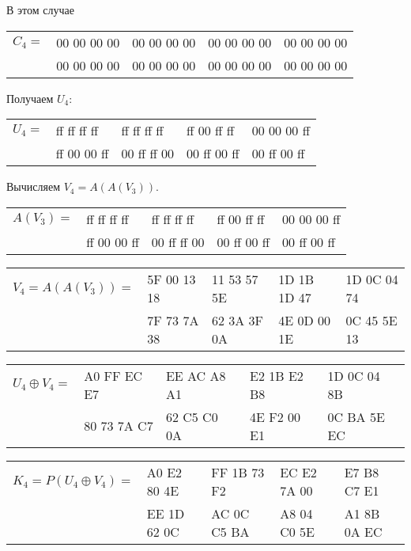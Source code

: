 \documentclass[10pt]{article}
\begin{document}
В этом случае

\begin{center}
  \begin{tabular}{lllll}
    $C_4 =$ & 00 00 00 00 & 00 00 00 00 & 00 00 00 00 & 00 00 00 00 \\
            & 00 00 00 00 & 00 00 00 00 & 00 00 00 00 & 00 00 00 00 \\
  \end{tabular}
\end{center}

Получаем $U_4$:

\begin{center}
  \begin{tabular}{lllll}
    $U_4 =$ & ff ff ff ff & ff ff ff ff & ff 00 ff ff & 00 00 00 ff \\
            & ff 00 00 ff & 00 ff ff 00 & 00 ff 00 ff & 00 ff 00 ff \\
  \end{tabular}
\end{center}

Вычисляем $V_4 = A(A(V_3))$.

\begin{center}
  \begin{tabular}{lllll}
    $A(V_3) =$ & ff ff ff ff & ff ff ff ff & ff 00 ff ff & 00 00 00 ff \\
               & ff 00 00 ff & 00 ff ff 00 & 00 ff 00 ff & 00 ff 00 ff \\
  \end{tabular}
\end{center}

\begin{center}
  \begin{tabular}{lllll}
    $V_4 = A(A(V_3)) =$ & 5F 00 13 18 & 11 53 57 5E & 1D 1B 1D 47 & 1D 0C 04 74 \\
                        & 7F 73 7A 38 & 62 3A 3F 0A & 4E 0D 00 1E & 0C 45 5E 13 \\
  \end{tabular}
\end{center}

\begin{center}
  \begin{tabular}{lllll}
    $U_4 \oplus V_4 =$ & A0 FF EC E7 & EE AC A8 A1 & E2 1B E2 B8 & 1D 0C 04 8B \\
                       & 80 73 7A C7 & 62 C5 C0 0A & 4E F2 00 E1 & 0C BA 5E EC \\
  \end{tabular}
\end{center}

\begin{center}
  \begin{tabular}{lllll}
    $K_4 = P(U_4 \oplus V_4) =$ & A0 E2 80 4E & FF 1B 73 F2 & EC E2 7A 00 & E7 B8 C7 E1 \\
                                & EE 1D 62 0C & AC 0C C5 BA & A8 04 C0 5E & A1 8B 0A EC \\
  \end{tabular}
\end{center}
\end{document}
